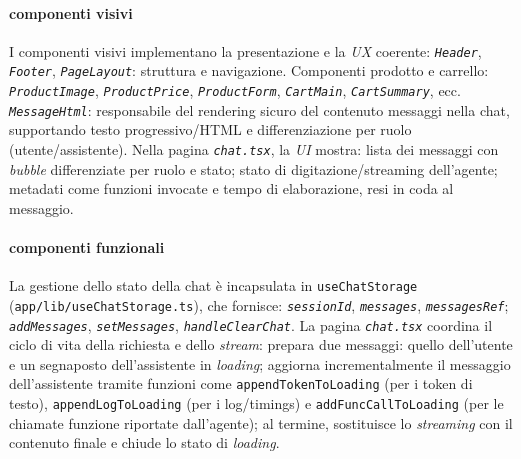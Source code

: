 \paragraph{\textbf{componenti visivi}}
I componenti visivi implementano la presentazione e la \emph{UX} coerente:
\texttt{\emph{Header}}, \texttt{\emph{Footer}}, \texttt{\emph{PageLayout}}: struttura e navigazione.
Componenti prodotto e carrello: \texttt{\emph{ProductImage}}, \texttt{\emph{ProductPrice}}, \texttt{\emph{ProductForm}}, \texttt{\emph{CartMain}}, \texttt{\emph{CartSummary}}, ecc.
\texttt{\emph{MessageHtml}}: responsabile del rendering sicuro del contenuto messaggi nella chat, supportando testo progressivo/HTML e differenziazione per ruolo (utente/assistente).
Nella pagina \texttt{\emph{chat.tsx}}, la \emph{UI} mostra:
lista dei messaggi con \emph{bubble} differenziate per ruolo e stato;
stato di digitazione/streaming dell’agente;
metadati come funzioni invocate e tempo di elaborazione, resi in coda al messaggio.

\paragraph{\textbf{componenti funzionali}}
La gestione dello stato della chat è incapsulata in \texttt{useChatStorage} (\texttt{app/lib/useChatStorage.ts}), che fornisce:
\texttt{\emph{sessionId}}, \texttt{\emph{messages}}, \texttt{\emph{messagesRef}};
\texttt{\emph{addMessages}}, \texttt{\emph{setMessages}}, \texttt{\emph{handleClearChat}}.
La pagina \texttt{\emph{chat.tsx}} coordina il ciclo di vita della richiesta e dello \emph{stream}:
prepara due messaggi: quello dell’utente e un segnaposto dell’assistente in \emph{loading};
aggiorna incrementalmente il messaggio dell’assistente tramite funzioni come \texttt{appendTokenToLoading} (per i token di testo), 
\texttt{appendLogToLoading} (per i log/timings) e \texttt{addFuncCallToLoading} (per le chiamate funzione riportate dall’agente);
al termine, sostituisce lo \emph{streaming} con il contenuto finale e chiude lo stato di \emph{loading}.


